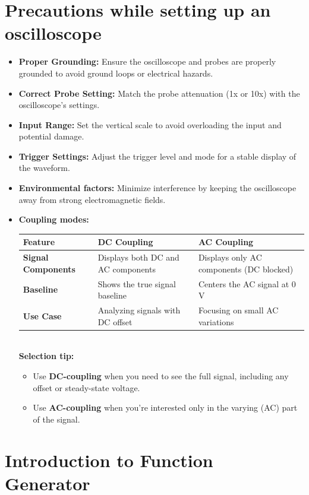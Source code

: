 \documentclass[12pt]{article}
\begin{document}
\section{Precautions while setting up an oscilloscope}
\begin{itemize}
    \item \textbf{Proper Grounding:} Ensure the oscilloscope and probes are properly grounded to avoid ground loops or electrical hazards.
    \item \textbf{Correct Probe Setting:} Match the probe attenuation (1x or 10x) with the oscilloscope's settings.
    \item \textbf{Input Range:} Set the vertical scale to avoid overloading the input and potential damage.
    \item \textbf{Trigger Settings:} Adjust the trigger level and mode for a stable display of the waveform.
    \item \textbf{Environmental factors: } Minimize interference by keeping the oscilloscope away from strong electromagnetic fields. 
    \item \textbf{Coupling modes: }\\
\begin{tabular}{@{}|p{4cm}|p{5cm}|p{5cm}|@{}}
\hline
\textbf{Feature}          & \textbf{DC Coupling}                       & \textbf{AC Coupling}                       \\ \hline
\textbf{Signal Components} & Displays both DC and AC components        & Displays only AC components (DC blocked)   \\ \hline
\textbf{Baseline}          & Shows the true signal baseline            & Centers the AC signal at 0 V              \\ \hline
\textbf{Use Case}          & Analyzing signals with DC offset          & Focusing on small AC variations           \\ \hline
\end{tabular}\\
\textbf{Selection tip:}\\
\begin{itemize}
    \item Use \textbf{DC-coupling} when you need to see the full signal, including any offset or steady-state voltage.
    \item Use \textbf{AC-coupling} when you're interested only in the varying (AC) part of the signal.
\end{itemize}
\end{itemize}
\section{Introduction to Function Generator}
\end{document}
